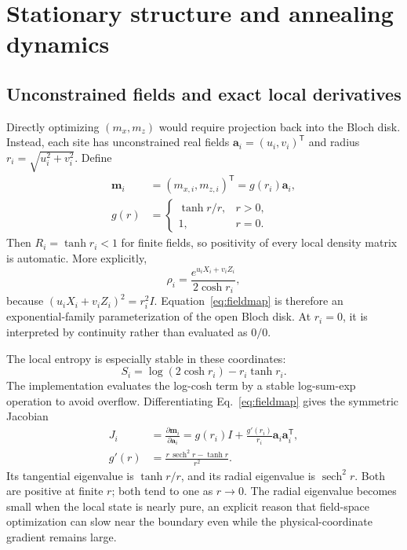 \section{Stationary structure and annealing dynamics}
\label{sec:theory}

\subsection{Unconstrained fields and exact local derivatives}

Directly optimizing $(m_x,m_z)$ would require projection back into the
Bloch disk. Instead, each site has unconstrained real fields
$\bm a_i=(u_i,v_i)^{\mathsf T}$ and radius
$r_i=\sqrt{u_i^2+v_i^2}$. Define
\begin{equation}
 \begin{aligned}
 \bm m_i&=(m_{x,i},m_{z,i})^{\mathsf T}
 =g(r_i)\bm a_i,\\
 g(r)&=\begin{cases}\tanh r/r,&r>0,\\1,&r=0.\end{cases}
 \end{aligned}
 \label{eq:fieldmap}
\end{equation}
Then $R_i=\tanh r_i<1$ for finite fields, so positivity of every local
density matrix is automatic. More explicitly,
\begin{equation}
 \rho_i=\frac{e^{u_iX_i+v_iZ_i}}{2\cosh r_i},
 \label{eq:localexp}
\end{equation}
because $(u_iX_i+v_iZ_i)^2=r_i^2I$.
Equation~\eqref{eq:fieldmap} is therefore an exponential-family
parameterization of the open Bloch disk. At $r_i=0$, it is interpreted by
continuity rather than evaluated as $0/0$.

The local entropy is especially stable in these coordinates:
\begin{equation}
 S_i=\log(2\cosh r_i)-r_i\tanh r_i.
 \label{eq:fieldentropy}
\end{equation}
The implementation evaluates the log-cosh term by a stable log-sum-exp
operation to avoid overflow. Differentiating
Eq.~\eqref{eq:fieldmap} gives the symmetric Jacobian
\begin{equation}
 \begin{aligned}
 J_i&=\frac{\partial\bm m_i}{\partial\bm a_i}
 =g(r_i)I+\frac{g'(r_i)}{r_i}\bm a_i\bm a_i^{\mathsf T},\\
 g'(r)&=\frac{r\,\operatorname{sech}^2r-\tanh r}{r^2}.
 \end{aligned}
 \label{eq:jacobian}
\end{equation}
Its tangential eigenvalue is $\tanh r/r$, and its radial eigenvalue is
$\operatorname{sech}^2r$. Both are positive at finite $r$; both tend to one
as $r\to0$. The radial eigenvalue becomes small when the local state is
nearly pure, an explicit reason that field-space optimization can slow near
the boundary even while the physical-coordinate gradient remains large.

